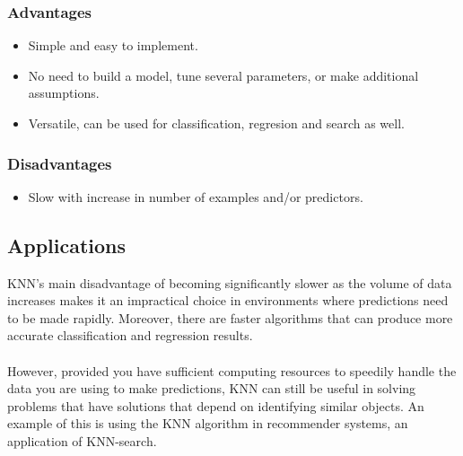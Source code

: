 \documentclass[12pt, A4]{report}
\begin{document}
	\subsubsection*{Advantages}
	\begin{itemize}
		\item Simple and easy to implement.
		\item No need to build a model, tune several parameters, or make additional assumptions.
		\item Versatile, can be used for classification, regresion and search as well.
	\end{itemize}

	\subsubsection*{Disadvantages}
	\begin{itemize}
		\item Slow with increase in number of examples and/or predictors.
	\end{itemize}
	
\subsection*{Applications}
	KNN’s main disadvantage of becoming significantly slower as the volume of data increases makes it an impractical choice in environments where predictions need to be made rapidly. Moreover, there are faster algorithms that can produce more accurate classification and regression results.\\ \\
	However, provided you have sufficient computing resources to speedily handle the data you are using to make predictions, KNN can still be useful in solving problems that have solutions that depend on identifying similar objects. An example of this is using the KNN algorithm in recommender systems, an application of KNN-search.
\end{document}
